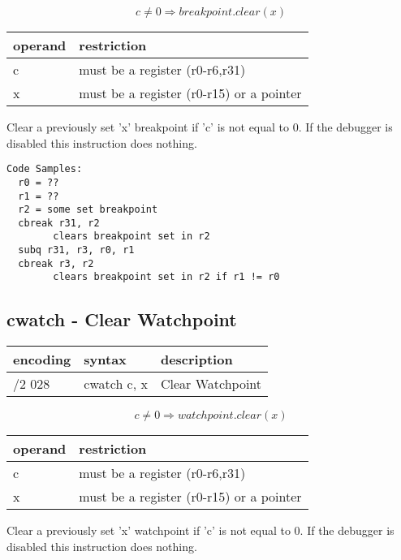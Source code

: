 \documentclass[letterpaper,10pt,openright,twoside,onecolumn]{book}
\begin{document}
  \begin{displaymath} c \neq 0 \Rightarrow breakpoint.clear(x)\end{displaymath}

  \flushleft
  \begin{tabular}{|l|l|}
   \hline
    operand & restriction \\
   \hline
    c & must be a register (r0-r6,r31) \\
    x & must be a register (r0-r15) or a pointer \\
   \hline
  \end{tabular}

  Clear a previously set 'x' breakpoint if 'c' is not equal to 0.  If the debugger
  is disabled this instruction does nothing.

  \begin{verbatim}
Code Samples:
  r0 = ??
  r1 = ??
  r2 = some set breakpoint
  cbreak r31, r2
        clears breakpoint set in r2
  subq r31, r3, r0, r1
  cbreak r3, r2 
        clears breakpoint set in r2 if r1 != r0
  \end{verbatim}
\newpage\subsection{cwatch - Clear Watchpoint}
  \begin{tabular}{|l|l|l|}
   \hline
    encoding & syntax & description \\
   \hline
    /2 028 & cwatch c, x & Clear Watchpoint \\
   \hline
  \end{tabular}

  \begin{displaymath} c \neq 0 \Rightarrow watchpoint.clear(x)\end{displaymath}

  \flushleft
  \begin{tabular}{|l|l|}
   \hline
    operand & restriction \\
   \hline
    c & must be a register (r0-r6,r31) \\
    x & must be a register (r0-r15) or a pointer \\
   \hline
  \end{tabular}

  Clear a previously set 'x' watchpoint if 'c' is not equal to 0.  If the debugger
  is disabled this instruction does nothing.
\end{document}
